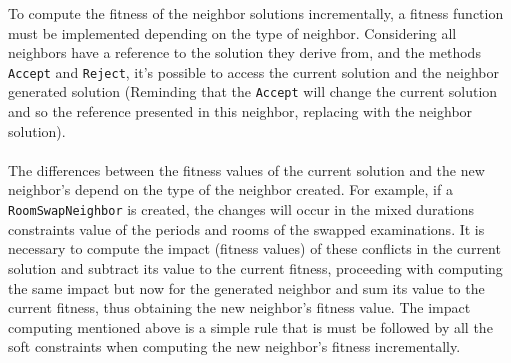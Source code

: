To compute the fitness of the neighbor solutions incrementally, a fitness function must be implemented depending on the type of neighbor. Considering all neighbors have a reference to the solution they derive from, and the methods \verb+Accept+ and \verb+Reject+, it's possible to access the current solution and the neighbor generated solution (Reminding that the \verb+Accept+ will change the current solution and so the reference presented in this neighbor, replacing with the neighbor solution). \\
\\
The differences between the fitness values of the current solution and the new neighbor's depend on the type of the neighbor created. For example, if a \verb+RoomSwapNeighbor+ is created, the changes will occur in the mixed durations constraints value of the periods and rooms of the swapped examinations. It is necessary to compute the impact (fitness values) of these conflicts in the current solution and subtract its value to the current fitness, proceeding with computing the same impact but now for the generated neighbor and sum its value to the current fitness, thus obtaining the new neighbor's fitness value. The impact computing mentioned above is a simple rule that is must be followed by all the soft constraints when computing the new neighbor's fitness incrementally.
